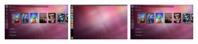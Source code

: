 \documentclass{acm_proc_article-sp}
\newcommand{\thumbheight}{16mm}
\newenvironment{thumbsequence}{}{\makebox[4mm]{}}
\begin{document}
\begin{figure}
\begin{centering}
	\begin{thumbsequence}
		\includegraphics[height=\thumbheight]{resources/ubuntu/looseduplicate1.jpg}
		\includegraphics[height=\thumbheight]{resources/ubuntu/looseduplicate2.jpg}
		\includegraphics[height=\thumbheight]{resources/ubuntu/looseduplicate3.jpg}

\end{thumbsequence}
\end{centering}
\end{figure}
\end{document}
